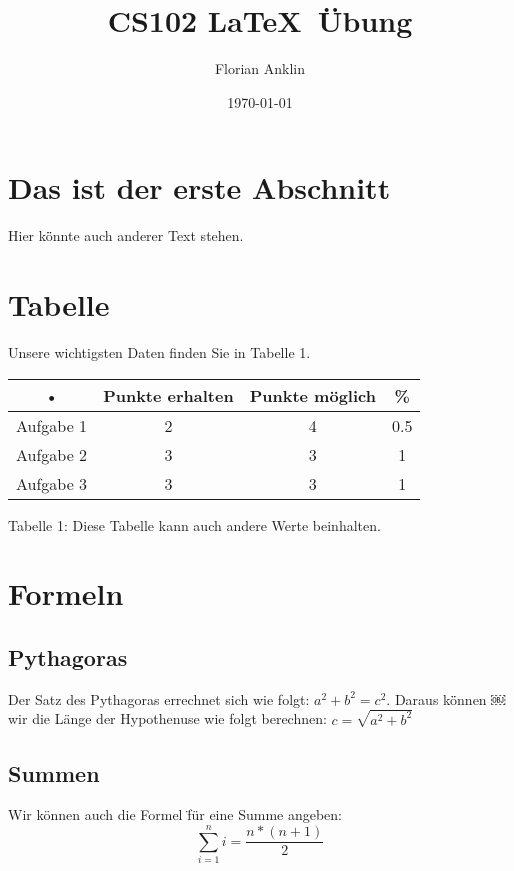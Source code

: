 \documentclass{article}
\author{Florian Anklin}
\title{CS102 \LaTeX\ \"Ubung}
\date{\today}
\begin{document}
\maketitle
\section{Das ist der erste Abschnitt}
Hier k\"önnte auch anderer Text stehen.
\section{Tabelle}
Unsere wichtigsten Daten finden Sie in Tabelle 1.
\begin{center}
\begin{tabular}{c|c|c|c}
• & Punkte erhalten & Punkte m\"oglich & \% \\ 
\hline 
Aufgabe 1 & 2 & 4 & 0.5 \\ 
Aufgabe 2 & 3 & 3 & 1 \\ 
Aufgabe 3 & 3 & 3 & 1 \\ 
\end{tabular} 

\vspace{1em}
Tabelle 1: Diese Tabelle kann auch andere Werte beinhalten.
\end{center}
\section{Formeln}
\subsection{Pythagoras}
Der Satz des Pythagoras errechnet sich wie folgt: $a^2+b^2=c^2$. Daraus k\"önnen
￼wir die L\"ange der Hypothenuse wie folgt berechnen: $c=\sqrt{a^2+b^2}$
\subsection{Summen}
Wir k\"onnen auch die Formel f̈\"ur eine Summe angeben:
\begin{equation}
\sum_{i=1}^n i=\frac{n*(n+1)}{2}
\end{equation}
\end{document}

